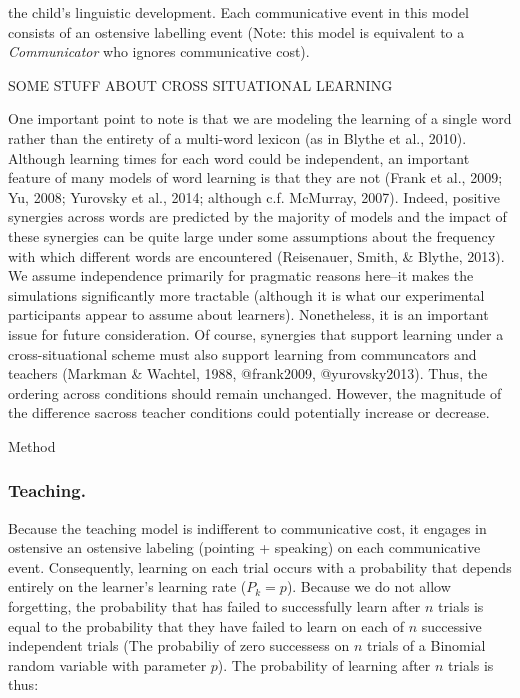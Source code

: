 \documentclass[english,,man,floatsintext]{apa6}
\begin{document}
the child's linguistic development. Each communicative event in this model consists of an ostensive labelling event (Note: this model is equivalent to a \emph{Communicator} who ignores communicative cost).

SOME STUFF ABOUT CROSS SITUATIONAL LEARNING

One important point to note is that we are modeling the learning of a single word rather than the entirety of a multi-word lexicon (as in Blythe et al., 2010). Although learning times for each word could be independent, an important feature of many models of word learning is that they are not (Frank et al., 2009; Yu, 2008; Yurovsky et al., 2014; although c.f. McMurray, 2007). Indeed, positive synergies across words are predicted by the majority of models and the impact of these synergies can be quite large under some assumptions about the frequency with which different words are encountered (Reisenauer, Smith, \& Blythe, 2013). We assume independence primarily for pragmatic reasons here--it makes the simulations significantly more tractable (although it is what our experimental participants appear to assume about learners). Nonetheless, it is an important issue for future consideration. Of course, synergies that support learning under a cross-situational scheme must also support learning from communcators and teachers (Markman \& Wachtel, 1988, @frank2009, @yurovsky2013). Thus, the ordering across conditions should remain unchanged. However, the magnitude of the difference sacross teacher conditions could potentially increase or decrease.

Method

\hypertarget{teaching.}{%
\subsubsection{Teaching.}\label{teaching.}}

Because the teaching model is indifferent to communicative cost, it engages in ostensive an ostensive labeling (pointing + speaking) on each communicative event. Consequently, learning on each trial occurs with a probability that depends entirely on the learner's learning rate (\(P_{k}=p\)). Because we do not allow forgetting, the probability that has failed to successfully learn after \(n\) trials is equal to the probability that they have failed to learn on each of \(n\) successive independent trials (The probabiliy of zero successess on \(n\) trials of a Binomial random variable with parameter \(p\)). The probability of learning after \(n\) trials is thus:
\end{document}
